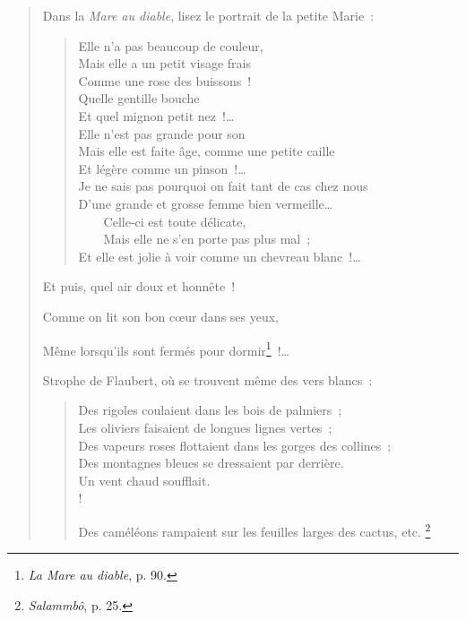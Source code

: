 \documentclass[french,twoside]{book} %
\newenvironment{quoteblock}%
  {\begin{quoting}}
  {\end{quoting}}
\newenvironment{quotebar}{%
    \def\FrameCommand{{\color{rubric!10!}\vrule width 0.5em} \hspace{0.9em}}%
    \def\OuterFrameSep{\itemsep} %
    \MakeFramed {\advance\hsize-\width \FrameRestore}
  }%
  {%
    \endMakeFramed
  }
\renewenvironment{quoteblock}%
  {%
    \savenotes
    \setstretch{0.9}
    \normalfont
    \begin{quotebar}
  }
  {%
    \end{quotebar}
    \spewnotes
  }
\begin{document}
\begin{verse}
\noindent Dans la \emph{Mare au diable}, lisez le portrait de la petite Marie :\par


\begin{verse}
Elle n’a pas beaucoup de couleur,\\
Mais elle a un petit visage frais\\
Comme une rose des buissons !\\
Quelle gentille bouche\\
Et quel mignon petit nez !…\\
Elle n’est pas grande pour son\\
Mais elle est faite âge, comme une petite caille\\
Et légère comme un pinson !…\\
Je ne sais pas pourquoi on fait tant de cas chez nous\\
D’une grande et grosse femme bien vermeille…\\
    Celle-ci est toute délicate,\\
    Mais elle ne s’en porte pas plus mal ;\\
Et elle est jolie à voir comme un chevreau blanc !…\\
\end{verse}
\begin{quoteblock}
\noindent Et puis, quel air doux et honnête !\par
Comme on lit son bon cœur dans ses yeux,\par
Même lorsqu’ils sont fermés pour dormir\footnote{\emph{La Mare au diable}, p. 90.} !…
\end{quoteblock}

\noindent Strophe de Flaubert, où se trouvent même des vers blancs :\par


\begin{verse}
Des rigoles coulaient dans les bois de palmiers ;\\
Les oliviers faisaient de longues lignes vertes ;\\
Des vapeurs roses flottaient dans les gorges des collines ;\\
Des montagnes bleues se dressaient par derrière.\\
Un vent chaud soufflait.\\!

\begin{quoteblock}
\noindent Des caméléons rampaient sur les feuilles larges des cactus, etc. \footnote{\emph{Salammbô}, p. 25.}
\end{quoteblock}


\end{verse}
\end{verse}
\end{document}
